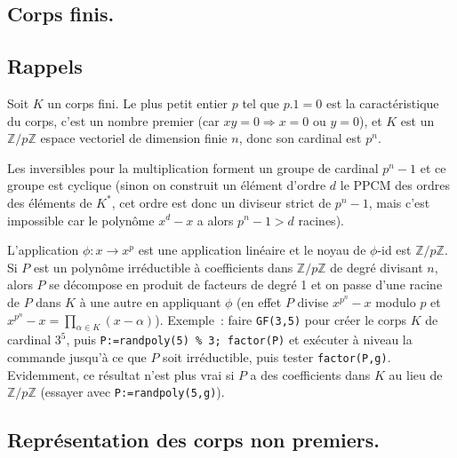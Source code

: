 \documentclass[a4paper,11pt]{article}
\newcommand{\Z}{{\mathbb{Z}}}
\begin{document}
\begin{giacjshere}
\section{Corps finis.} \label{sec:gf}
\subsection{Rappels}
Soit $K$ un corps fini. Le plus petit entier $p$ tel que
$p.1=0$ est la caract\'eristique du corps, c'est un nombre premier
(car $xy=0 \Rightarrow x=0$ ou $y=0$), et $K$ est un $\Z/p\Z$
espace vectoriel de dimension finie $n$, donc son cardinal est $p^n$.

Les inversibles pour la multiplication forment un groupe de cardinal
$p^n-1$ et ce groupe est cyclique (sinon on construit un \'el\'ement
d'ordre $d$ le PPCM des ordres des \'el\'ements de $K^*$, cet ordre
est donc un diviseur strict de $p^n-1$, mais c'est impossible car
le polyn\^ome $x^d-x$ a alors $p^n-1>d$ racines).

L'application $\phi:x \rightarrow x^p$ est une application lin\'eaire
et le noyau de $\phi$-id est $\Z/p\Z$. Si $P$ est un polyn\^ome 
irr\'eductible \`a coefficients dans $\Z/p\Z$ de degr\'e divisant $n$, alors
$P$ se d\'ecompose en produit de facteurs de degr\'e 1 et on passe
d'une racine de $P$ dans $K$ \`a une autre en appliquant $\phi$
(en effet $P$ divise $x^{p^n}-x$ modulo $p$ et
$x^{p^n}-x=\prod_{\alpha \in K} (x-\alpha)$).
Exemple~: faire \verb|GF(3,5)| pour cr\'eer le corps $K$
de cardinal $3^5$, puis 
\verb|P:=randpoly(5) % 3; factor(P)|
et ex\'ecuter \`a niveau la commande jusqu'\`a ce que $P$ soit
irr\'eductible, puis tester \verb|factor(P,g)|.
Evidemment, ce r\'esultat n'est plus vrai si $P$ a des coefficients
dans $K$ au lieu de $\Z/p\Z$ (essayer avec \verb|P:=randpoly(5,g)|).

\subsection{Repr\'esentation des corps non premiers.}

\end{giacjshere}
\end{document}
